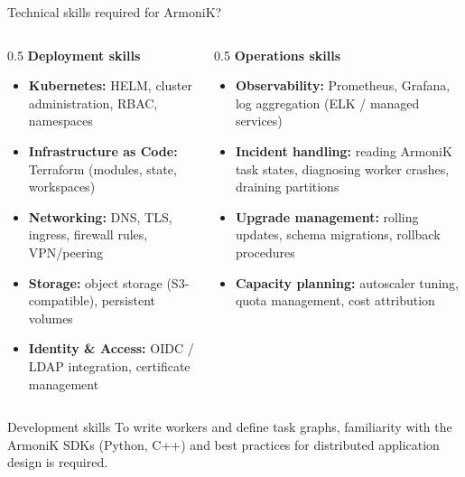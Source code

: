 \begin{frame}{Technical skills required for ArmoniK?}
	\begin{columns}[T]
		\begin{column}{0.5\textwidth}
			\textbf{Deployment skills}
			\begin{itemize}
				\item \textbf{Kubernetes:} HELM, cluster administration, RBAC, namespaces
				\item \textbf{Infrastructure as Code:} Terraform (modules, state, workspaces)
				\item \textbf{Networking:} DNS, TLS, ingress, firewall rules, VPN/peering
				\item \textbf{Storage:} object storage (S3-compatible), persistent volumes
				\item \textbf{Identity \& Access:} OIDC / LDAP integration, certificate management
			\end{itemize}
		\end{column}
		\begin{column}{0.5\textwidth}
			\textbf{Operations skills}
			\begin{itemize}
				\item \textbf{Observability:} Prometheus, Grafana, log aggregation (ELK / managed services)
				\item \textbf{Incident handling:} reading ArmoniK task states, diagnosing worker crashes, draining partitions
				\item \textbf{Upgrade management:} rolling updates, schema migrations, rollback procedures
				\item \textbf{Capacity planning:} autoscaler tuning, quota management, cost attribution
			\end{itemize}
		\end{column}
	\end{columns}
	\vspace{0.2cm}
	\begin{alertblock}{Development skills}
		To write workers and define task graphs, familiarity with the ArmoniK SDKs (Python, C++) and best practices for distributed application design is required.
	\end{alertblock}
\end{frame}
